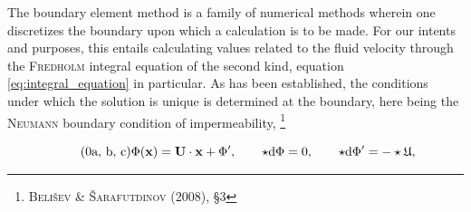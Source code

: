The boundary element method is a family of numerical methods wherein one discretizes the boundary upon which a calculation is to be made.
For our intents and purposes, this entails calculating values related to the fluid velocity through the \textsc{Fredholm} integral equation of the second kind, equation \eqref{eq:integral_equation} in particular.
As has been established, the conditions under which the solution is unique is determined at the boundary, here being the \textsc{Neumann} boundary condition of impermeability,%
\footnote{%
  \cite{belishev2008dirichlet} \textsc{Belišev} \& \textsc{Šarafutdinov} (2008), \S3
}

\begin{subequations}\label{eq:impermeability}
  \begin{equation}\tag{\theequation{a, b, c}}
    \Phi(\xvec) = \Uvec\cdot\xvec + \Phi^{\prime}, \qquad \star\dee\Phi = 0, \qquad \star\dee\Phi^{\prime} = -\star\mathfrak{U},
  \end{equation}
\end{subequations}

